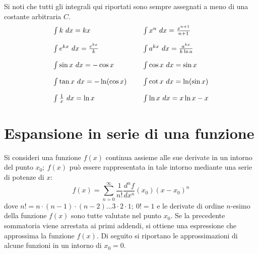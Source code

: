 \documentclass[10pt,a4paper]{book}
\begin{document}
Si noti che tutti gli integrali qui riportati sono sempre assegnati a meno di una costante arbitraria $\displaystyle C$.
\begin{equation*}
	\begin{array}{ l l }
		\int k\ dx=kx & \int x^n \ dx=\frac{x^{n+1}}{n+1}\\
		[4mm]
		\int e^{kx} \ dx=\frac{e^{kx}}{k} & \int a^{kx} \ dx=\frac{a^{kx}}{k\ln a}\\
		[4mm]
		\int \sin x\ dx=-\cos x & \int \cos x\ dx=\sin x\\
		[4mm]
		\int \tan x\ dx=-\ln(\cos x) \ \ \ \  & \int \cot x\ dx=\ln(\sin x)\\
		[4mm]
		\int \frac{1}{x} \ dx=\ln x & \int \ln x\ dx=x\ln x-x
	\end{array}
\end{equation*}







































\section{Espansione in serie di una funzione}

Si consideri una funzione $\displaystyle f( x)$ continua assieme alle sue derivate in un intorno del punto $\displaystyle x_0 ;\ f( x)$ può essere rappresentata in tale intorno mediante una serie di potenze di $\displaystyle x$:
\begin{equation*}
	f( x) =\sum^{\infty }_{n=0}\frac{1}{n!}\frac{d^n f}{dx^n}( x_0)( x-x_0)^n
\end{equation*}
dove $\displaystyle n!=n\cdot ( n-1) \cdot ( n-2) ...3\cdot 2\cdot 1;\ 0!=1$ e le derivate di ordine $\displaystyle n$-esimo della funzione $\displaystyle f( x)$ sono tutte valutate nel punto $\displaystyle x_0$. Se la precedente sommatoria viene arrestata ai primi addendi, si ottiene una espressione che approssima la funzione $\displaystyle f( x)$. Di seguito si riportano le approssimazioni di alcune funzioni in un intorno di $\displaystyle x_0 =0$.
\end{document}
